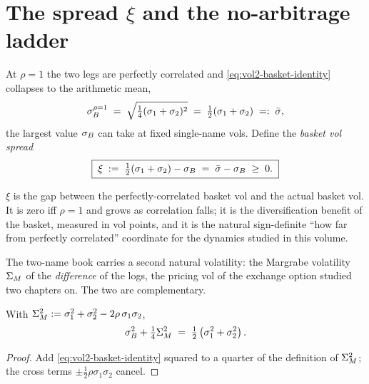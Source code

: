 \section{The spread $\xi$ and the no-arbitrage ladder}
\label{sec:vol2-ladder}

\begin{definition}
\label{def:vol2-xi}
At $\rho = 1$ the two legs are perfectly correlated and
\eqref{eq:vol2-basket-identity} collapses to the arithmetic mean,
\begin{equation}
\sigma_B^{\rho=1} \;=\; \sqrt{\tfrac14(\sigma_1+\sigma_2)^2}
           \;=\; \tfrac12(\sigma_1+\sigma_2) \;=:\; \bar\sigma,
\label{eq:vol2-sbar}
\end{equation}
the largest value $\sigma_B$ can take at fixed single-name vols. Define the
\emph{basket vol spread}
\begin{equation}
\boxed{\;\xi \;:=\; \tfrac12(\sigma_1+\sigma_2) - \sigma_B
      \;=\; \bar\sigma - \sigma_B \;\ge\; 0.\;}
\label{eq:vol2-xi}
\end{equation}
\end{definition}

$\xi$ is the gap between the perfectly-correlated basket vol and the actual
basket vol. It is zero iff $\rho = 1$ and grows as correlation falls; it is
the diversification benefit of the basket, measured in vol points, and it is
the natural sign-definite ``how far from perfectly correlated'' coordinate
for the dynamics studied in this volume.

The two-name book carries a second natural volatility: the Margrabe
volatility $\Sigma_M$ of the \emph{difference} of the logs, the pricing vol of
the exchange option studied two chapters on. The two are complementary.

\begin{lemma}
\label{lem:vol2-pythagoras}
With $\Sigma_M^2 := \sigma_1^2 + \sigma_2^2 - 2\rho\,\sigma_1\sigma_2$,
\begin{equation}
\sigma_B^2 + \tfrac14\Sigma_M^2 \;=\; \tfrac12\left(\sigma_1^2 + \sigma_2^2\right).
\label{eq:vol2-pythagoras}
\end{equation}
\end{lemma}

\begin{proof}
Add \eqref{eq:vol2-basket-identity} squared to a quarter of the definition of
$\Sigma_M^2$; the cross terms $\pm\tfrac12\rho\sigma_1\sigma_2$ cancel.
\end{proof}

